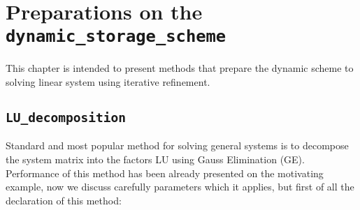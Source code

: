 \section{Preparations on the \texttt{dynamic\_storage\_scheme}}
This chapter is intended to present methods that prepare the dynamic scheme to solving linear system using iterative refinement.

\subsection{\texttt{LU\_decomposition}}
Standard and most popular method for solving general systems is to decompose the system matrix into the factors LU using Gauss Elimination (GE). Performance of this method has been already presented on the motivating example, now we discuss carefully parameters which it applies, but first of all the declaration of this method:

\newpage

